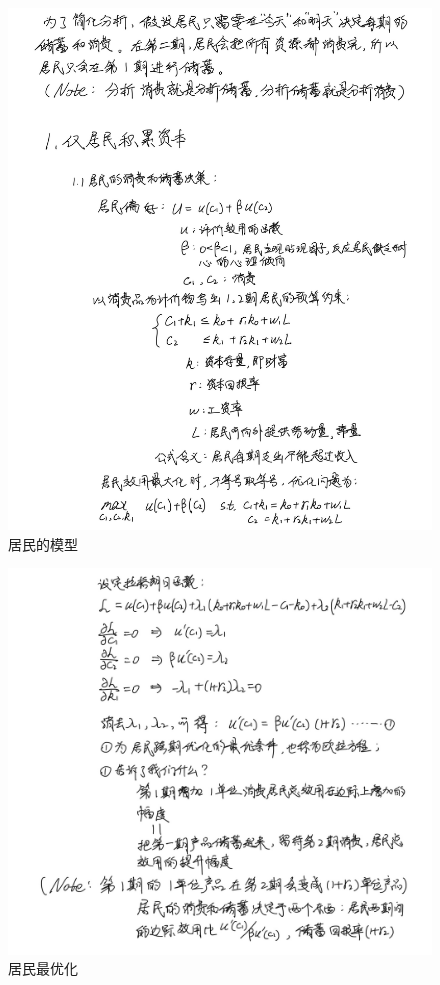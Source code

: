 \documentclass[UTF8]{article}
\begin{document}
        \begin{figure}[H]
            \centering
            \includegraphics[width = 1 \textwidth]{仅居民积累资本1.png}
            \caption{居民的模型}
        \end{figure}
        \begin{figure}[H]
            \centering
            \includegraphics[width = 1 \textwidth]{仅居民积累资本2.png}
            \caption{居民最优化}
        \end{figure}
\end{document}
